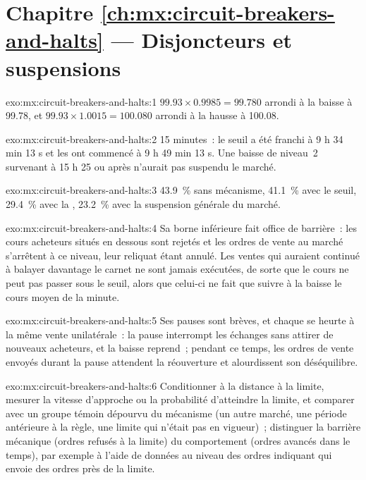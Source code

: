 \section*{Chapitre \ref{ch:mx:circuit-breakers-and-halts} --- Disjoncteurs et suspensions}

\begin{solution}{exo:mx:circuit-breakers-and-halts:1}
$99.93\times0.9985=99.780$ arrondi à la baisse à 99.78, et $99.93\times1.0015=100.080$ arrondi à la hausse à 100.08.
\end{solution}

\begin{solution}{exo:mx:circuit-breakers-and-halts:2}
15 minutes~: le seuil a été franchi à 9 h 34 min 13 s et les  ont commencé à 9 h 49 min 13 s. Une baisse de niveau~2 survenant à 15 h 25 ou après n'aurait pas
suspendu le marché.
\end{solution}

\begin{solution}{exo:mx:circuit-breakers-and-halts:3}
43.9~\% sans mécanisme, 41.1~\% avec le seuil, 29.4~\% avec la , 23.2~\% avec la suspension générale du marché.
\end{solution}

\begin{solution}{exo:mx:circuit-breakers-and-halts:4}
Sa borne inférieure fait office de barrière~: les cours acheteurs situés en dessous sont rejetés et les ordres de vente au marché s'arrêtent à ce niveau, leur reliquat étant annulé. Les ventes qui auraient continué à balayer
davantage le carnet ne sont jamais exécutées, de sorte que le cours ne peut pas passer sous le seuil, alors que celui-ci ne fait que suivre à la baisse le cours moyen de la minute.
\end{solution}

\begin{solution}{exo:mx:circuit-breakers-and-halts:5}
Ses pauses sont brèves, et chaque  se heurte à la même vente unilatérale~: la pause interrompt les échanges sans attirer de nouveaux acheteurs, et la baisse
reprend~; pendant ce temps, les ordres de vente envoyés durant la pause attendent la réouverture et alourdissent son déséquilibre.
\end{solution}

\begin{solution}{exo:mx:circuit-breakers-and-halts:6}
Conditionner à la distance à la limite, mesurer la vitesse d'approche ou la probabilité d'atteindre la limite, et comparer avec un groupe témoin
dépourvu du mécanisme (un autre marché, une période antérieure à la règle, une limite qui n'était pas en vigueur)~; distinguer la barrière mécanique (ordres refusés à
la limite) du comportement (ordres avancés dans le temps), par exemple à l'aide de données au niveau des ordres indiquant qui envoie des ordres près de la limite.
\end{solution}


